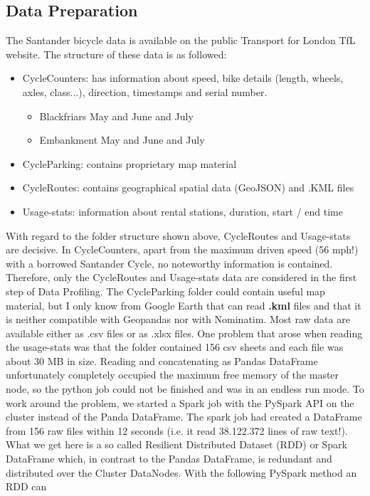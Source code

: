 \subsection{Data Preparation}
The Santander bicycle data is available on the public Transport for London TfL website.
The structure of these data is as followed:
\begin{itemize}
\item CycleCounters: has information about speed, bike details (length, wheels, axles, class...),
direction, timestamps and serial number.
\begin{itemize}
\item Blackfriars May and June and July
\item Embankment May and June and July
\end{itemize}
\item CycleParking: contains proprietary map material
\item CycleRoutes: contains geographical spatial data (GeoJSON) and .KML files
\item Usage-stats: information about rental stations, duration, start / end time
\end{itemize}
With regard to the folder structure shown above, CycleRoutes and Usage-stats are decisive. In
\glqq CycleCounters\grqq, apart from the maximum driven speed (56 mph!) with a borrowed Santander Cycle, no noteworthy information is contained. Therefore, only the CycleRoutes and Usage-stats data are
considered in the first step of Data Profiling. The CycleParking folder could contain useful map material,
but I only know from Google Earth that can read \textbf{.kml} files and that it is neither compatible with Geopandas nor with Nominatim. Most raw data are available either as .csv files or as .xlsx files.
One problem that arose when reading the usage-stats was that the folder contained 156 csv sheets and
each file was about 30 MB in size. Reading and concatenating as Pandas DataFrame unfortunately
completely occupied the maximum free memory of the master node, so the python job could not be
finished and was in an endless run mode. To work around the problem, we started a Spark job with the
PySpark API on the cluster instead of the Panda DataFrame. The spark job had created a DataFrame from
156 raw files within 12 seconds (i.e. it read 38.122.372 lines of raw text!). What we get here is a so called
Resilient Distributed Dataset (RDD) or Spark DataFrame which, in contrast to the Pandas DataFrame, is
redundant and distributed over the Cluster DataNodes. With the following PySpark method an RDD can
